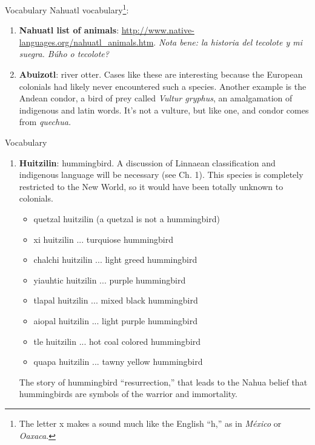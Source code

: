 \documentclass{beamer}
\begin{document}
\begin{frame}{Vocabulary}
\small
Nahuatl vocabulary\footnote{The letter x makes a sound much like the English ``h,'' as in \textit{M\'{e}xico} or \textit{Oaxaca}.}:
\begin{enumerate}
\item \textbf{Nahuatl list of animals}: \url{http://www.native-languages.org/nahuatl_animals.htm}. \textit{Nota bene: la historia del tecolote y mi suegra.  B\'{u}ho o tecolote?}
\item \textbf{Abuizotl}: river otter.  Cases like these are interesting because the European colonials had likely never encountered such a species.  Another example is the Andean condor, a bird of prey called \textit{Vultur gryphus}, an amalgamation of indigenous and latin words.  It's not a vulture, but like one, and condor comes from \textit{quechua.}
\end{enumerate}
\end{frame}

\begin{frame}{Vocabulary}
\small
\begin{enumerate}
\item \textbf{Huitzilin}: hummingbird.  A discussion of Linnaean classification and indigenous language will be necessary (see Ch. 1).  This species is completely restricted to the New World, so it would have been totally unknown to colonials.
\begin{itemize}
\item quetzal huitzilin (a quetzal is not a hummingbird)
\item xi huitzilin ... turquiose hummingbird
\item chalchi huitzilin ... light greed hummingbird
\item yiauhtic huitzilin ... purple hummingbird
\item tlapal huitzilin ... mixed black hummingbird
\item aiopal huitzilin ... light purple hummingbird
\item tle huitzilin ... hot coal colored hummingbird
\item quapa huitzilin ... tawny yellow hummingbird
\end{itemize}
The story of hummingbird ``resurrection,'' that leads to the Nahua belief that hummingbirds are symbols of the warrior and immortality.
\end{enumerate}
\end{frame}
\end{document}
